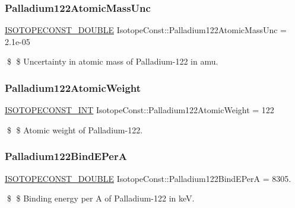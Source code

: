 \subsubsection{\texorpdfstring{Palladium122\+Atomic\+Mass\+Unc}{Palladium122AtomicMassUnc}}
{\footnotesize\ttfamily \mbox{\hyperlink{group___isotope_const-_macros_ga8f45a7272ce02c0b4c65c44636ed719a}{I\+S\+O\+T\+O\+P\+E\+C\+O\+N\+S\+T\+\_\+\+D\+O\+U\+B\+LE}} Isotope\+Const\+::\+Palladium122\+Atomic\+Mass\+Unc = 2.\+1e-\/05}

\$ \$ Uncertainty in atomic mass of Palladium-\/122 in amu. \mbox{\label{group___isotope_const-_palladium-_pd122_ga61c837a0821dee8e2d500fe9221116b4}} 
\subsubsection{\texorpdfstring{Palladium122\+Atomic\+Weight}{Palladium122AtomicWeight}}
{\footnotesize\ttfamily \mbox{\hyperlink{group___isotope_const-_macros_ga5f18360b3e99483a35c32d789e62621c}{I\+S\+O\+T\+O\+P\+E\+C\+O\+N\+S\+T\+\_\+\+I\+NT}} Isotope\+Const\+::\+Palladium122\+Atomic\+Weight = 122}

\$ \$ Atomic weight of Palladium-\/122. \mbox{\label{group___isotope_const-_palladium-_pd122_gafbafd4940a04622e6065937814303f53}} 
\subsubsection{\texorpdfstring{Palladium122\+Bind\+E\+PerA}{Palladium122BindEPerA}}
{\footnotesize\ttfamily \mbox{\hyperlink{group___isotope_const-_macros_ga8f45a7272ce02c0b4c65c44636ed719a}{I\+S\+O\+T\+O\+P\+E\+C\+O\+N\+S\+T\+\_\+\+D\+O\+U\+B\+LE}} Isotope\+Const\+::\+Palladium122\+Bind\+E\+PerA = 8305.}

\$ \$ Binding energy per A of Palladium-\/122 in keV. \mbox{\label{group___isotope_const-_palladium-_pd122_gacba34592a65648412c457a4044d5affc}} 
